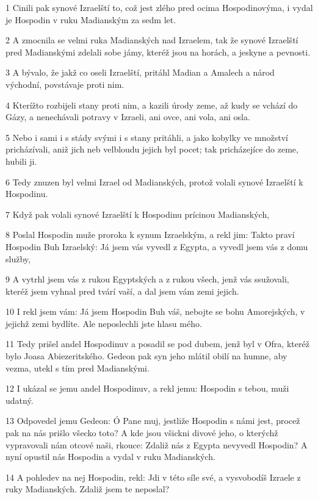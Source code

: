 \par 1 Cinili pak synové Izraelští to, což jest zlého pred ocima Hospodinovýma, i vydal je Hospodin v ruku Madianským za sedm let.
\par 2 A zmocnila se velmi ruka Madianských nad Izraelem, tak že synové Izraelští pred Madianskými zdelali sobe jámy, kteréž jsou na horách, a jeskyne a pevnosti.
\par 3 A bývalo, že jakž co oseli Izraelští, pritáhl Madian a Amalech a národ východní, povstávaje proti nim.
\par 4 Kterížto rozbijeli stany proti nim, a kazili úrody zeme, až kudy se vchází do Gázy, a nenechávali potravy v Izraeli, ani ovce, ani vola, ani osla.
\par 5 Nebo i sami i s stády svými i s stany pritáhli, a jako kobylky ve množství pricházívali, aniž jich neb velbloudu jejich byl pocet; tak pricházejíce do zeme, hubili ji.
\par 6 Tedy znuzen byl velmi Izrael od Madianských, protož volali synové Izraelští k Hospodinu.
\par 7 Když pak volali synové Izraelští k Hospodinu prícinou Madianských,
\par 8 Poslal Hospodin muže proroka k synum Izraelským, a rekl jim: Takto praví Hospodin Buh Izraelský: Já jsem vás vyvedl z Egypta, a vyvedl jsem vás z domu služby,
\par 9 A vytrhl jsem vás z rukou Egyptských a z rukou všech, jenž vás ssužovali, kteréž jsem vyhnal pred tvárí vaší, a dal jsem vám zemi jejich.
\par 10 I rekl jsem vám: Já jsem Hospodin Buh váš, nebojte se bohu Amorejských, v jejichž zemi bydlíte. Ale neposlechli jste hlasu mého.
\par 11 Tedy prišel andel Hospodinuv a posadil se pod dubem, jenž byl v Ofra, kteréž bylo Joasa Abiezeritského. Gedeon pak syn jeho mlátil obilí na humne, aby vezma, utekl s tím pred Madianskými.
\par 12 I ukázal se jemu andel Hospodinuv, a rekl jemu: Hospodin s tebou, muži udatný.
\par 13 Odpovedel jemu Gedeon: Ó Pane muj, jestliže Hospodin s námi jest, procež pak na nás prišlo všecko toto? A kde jsou všickni divové jeho, o kterýchž vypravovali nám otcové naši, rkouce: Zdaliž nás z Egypta nevyvedl Hospodin? A nyní opustil nás Hospodin a vydal v ruku Madianských.
\par 14 A pohledev na nej Hospodin, rekl: Jdi v této síle své, a vysvobodíš Izraele z ruky Madianských. Zdaliž jsem te neposlal?
